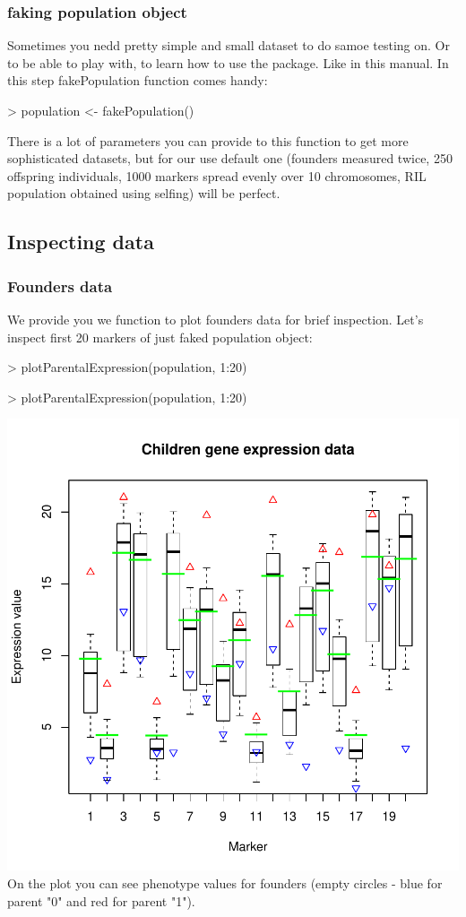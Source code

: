 \documentclass{article}
\begin{document}
\subsubsection{faking population object}
Sometimes you nedd pretty simple and small dataset to do samoe testing on. Or to be able to play with, to learn how to use the package. Like in this manual. In this step fakePopulation function comes handy: 
\begin{Schunk}
\begin{Sinput}
> population <- fakePopulation()
\end{Sinput}
\end{Schunk}
There is a lot of parameters you can provide to this function to get more sophisticated datasets, but for our use default one (founders measured twice, 250 offspring individuals, 1000 markers spread evenly over 10 chromosomes, 
RIL population obtained using selfing) will be perfect. 
\newpage
\subsection{Inspecting data}
\subsubsection{Founders data}
We provide you we function to plot founders data for brief inspection. Let's inspect first 20 markers of just faked population object:
\begin{Schunk}
\begin{Sinput}
> plotParentalExpression(population, 1:20)
\end{Sinput}
\end{Schunk}
\begin{Schunk}
\begin{Sinput}
> plotParentalExpression(population, 1:20)
\end{Sinput}
\end{Schunk}
\includegraphics{manual-007}
On the plot you can see phenotype values for founders (empty circles - blue for parent "0" and red for parent "1").
\newpage
\end{document}
